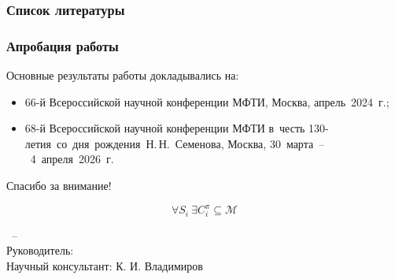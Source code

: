 
\begin{frame}[t,allowframebreaks]
  \frametitle{Список литературы}
  \nocite{sitito_2}%
  \nocite{sitito_1}%
  \nocite{mipt68}%
\end{frame}

\begin{frame}
  \frametitle{Апробация работы}
  Основные результаты работы докладывались на:
  \begin{itemize}
    \item 66-й Всероссийской научной конференции МФТИ, Москва,
      апрель~2024~г.;
    \item 68-й Всероссийской научной конференции МФТИ в~честь
      130-летия~со~дня~рождения~Н.\,Н.~Семенова, Москва,
      30~марта~--~4~апреля~2026~г.
  \end{itemize}
\end{frame}

\begin{frame} %
  \begin{center}
    \Huge
    Спасибо за внимание!
  \end{center}
  \begin{center}
    \LARGE
    \[
      \forall S_i\ \exists
      C_i^\pi \subseteq \mathcal{M}
    \]
  \end{center}
  \vfill
  \begin{center}
    \thesisAuthorShort\ -- \thesisTitle\\
    Руководитель: \supervisorFioShort \\
    Научный консультант: К. И. Владимиров
  \end{center}
\end{frame}
